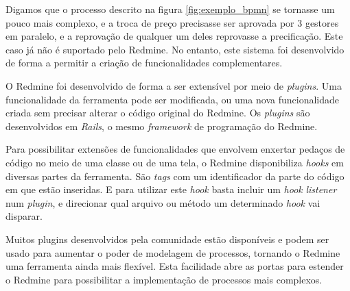 Digamos que o processo descrito na figura \ref{fig:exemplo_bpmn} se tornasse um pouco mais complexo, e a troca de preço precisasse ser aprovada por 3 gestores em paralelo, e a reprovação de qualquer um deles reprovasse a precificação. Este caso já não é suportado pelo Redmine. No entanto, este sistema foi desenvolvido de forma a permitir a criação de funcionalidades complementares.

O Redmine foi desenvolvido de forma a ser extensível por meio de \textit{plugins}. Uma funcionalidade da ferramenta pode ser modificada, ou uma nova funcionalidade criada sem precisar alterar o código original do Redmine. Os \textit{plugins} são desenvolvidos em \textit{Rails}, o mesmo \textit{framework} de programação do Redmine. 

Para possibilitar extensões de funcionalidades que envolvem enxertar pedaços de código no meio de uma classe ou de uma tela, o Redmine disponibiliza \textit{hooks} em diversas partes da ferramenta. São \textit{tags} com um identificador da parte do código em que estão inseridas. E para utilizar este \textit{hook} basta incluir um \textit{hook} \textit{listener} num \textit{plugin}, e direcionar qual arquivo ou método um determinado \textit{hook} vai disparar.

Muitos plugins desenvolvidos pela comunidade estão disponíveis e podem ser usado para aumentar o poder de modelagem de processos, tornando o Redmine uma ferramenta ainda mais flexível. Esta facilidade abre as portas para estender o Redmine para possibilitar a implementação de processos mais complexos.  